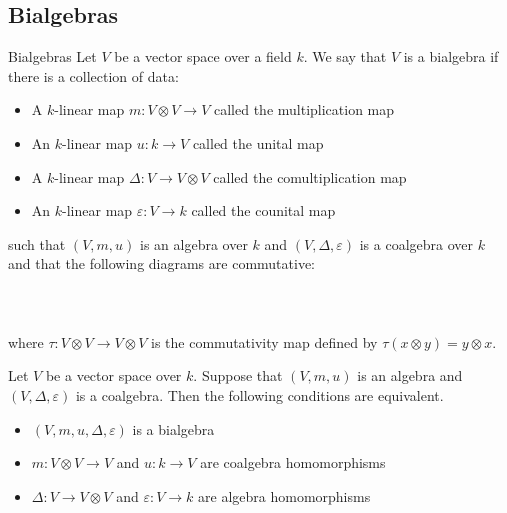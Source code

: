 \documentclass[a4paper]{article}
\begin{document}
\subsection{Bialgebras}
\begin{defn}{Bialgebras}{} Let $V$ be a vector space over a field $k$. We say that $V$ is a bialgebra if there is a collection of data: 
\begin{itemize}
\item A $k$-linear map $m:V\otimes V\to V$ called the multiplication map
\item An $k$-linear map $u:k\to V$ called the unital map
\item A $k$-linear map $\Delta:V\to V\otimes V$ called the comultiplication map
\item An $k$-linear map $\varepsilon:V\to k$ called the counital map
\end{itemize}
such that $(V,m,u)$ is an algebra over $k$ and $(V,\Delta,\varepsilon)$ is a coalgebra over $k$ and that the following diagrams are commutative: \\~\\
\\~\\
where $\tau:V\otimes V\to V\otimes V$ is the commutativity map defined by $\tau(x\otimes y)=y\otimes x$. 
\end{defn}

\begin{thm}{}{} Let $V$ be a vector space over $k$. Suppose that $(V,m,u)$ is an algebra and $(V,\Delta,\varepsilon)$ is a coalgebra. Then the following conditions are equivalent. 
\begin{itemize}
\item $(V,m,u,\Delta,\varepsilon)$ is a bialgebra
\item $m:V\otimes V\to V$ and $u:k\to V$ are coalgebra homomorphisms
\item $\Delta:V\to V\otimes V$ and $\varepsilon:V\to k$ are algebra homomorphisms
\end{itemize}
\end{thm}
\end{document}
